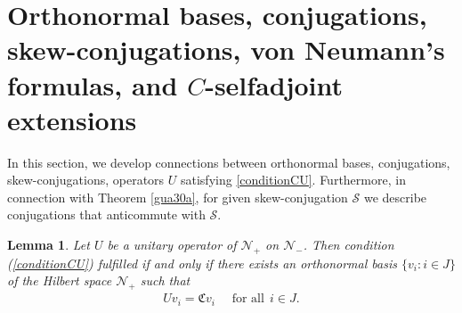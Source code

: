 \documentclass[12pt]{amsart}
\newtheorem{lem}[thm]{Lemma}
\theoremstyle{definition}
\newcommand{\cN}{\mathcal{N}}
\newcommand{\cS}{\mathcal{S}}
\newcommand{\gC}{\mathfrak{C}}
\begin{document}
\section{Orthonormal bases, conjugations, skew-conjugations, von Neumann's formulas, and $C$-selfadjoint extensions}\label{append}

In this section, we develop connections between orthonormal bases, conjugations, skew-conjugations, operators $U$ satisfying \eqref{conditionCU}.
Furthermore, in connection with Theorem \ref{gua30a}, for given skew-conjugation $\cS$ we describe conjugations that anticommute with $\cS$.

\begin{lem}\label{orthobasN+}
Let  $U$ be a unitary operator of $\cN_+$ on $\cN_-$. Then condition (\ref{conditionCU}) fulfilled if and only if
there exists an orthonormal basis $\{v_i:i\in J\}$ of the Hilbert space $\cN_+$ such that
\begin{align}\label{ucbasis}
Uv_i =\gC v_i  \quad \textrm{ for all}~~ i\in J.
\end{align}
\end{lem}
\end{document}
